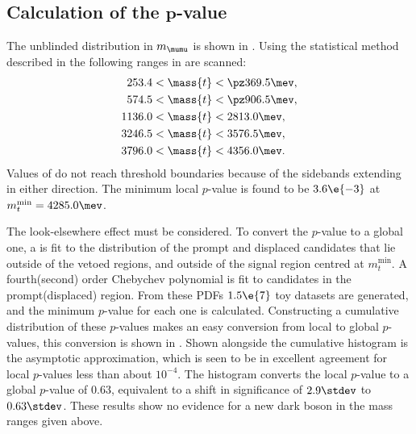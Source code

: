\subsection[Calculation of the $p$-value]
{Calculation of the $\boldsymbol{p}$-value}

The unblinded distribution in $m_{\mumu}$ is shown in .
Using the statistical method described in  the following ranges in 
are scanned:
\begin{align*}
  253.4 &< \mass{t} < \pz369.5 \mev, \\
  574.5 &< \mass{t} < \pz906.5 \mev, \\
  1136.0 &< \mass{t} < 2813.0 \mev, \\
  3246.5 &< \mass{t} < 3576.5 \mev, \\
  3796.0 &< \mass{t} < 4356.0 \mev.
\end{align*}
Values of  do not reach threshold boundaries because of the sidebands extending in either
direction.
The minimum local $p$-value is found to be $3.6\e{-3}$ at $m_{t}^\mathrm{min} = 4285.0\mev$.

The look-elsewhere effect must be considered.
To convert the $p$-value to a global one, a \PDF is fit to the \mass{\mumu} distribution of the
prompt and displaced \btokstrdb candidates that lie outside of the vetoed regions, and outside of
the signal region centred at $m_t^\mathrm{min}$.
A fourth(second) order Chebychev polynomial is fit to candidates in the prompt(displaced) region.
From these \glspl{PDF} $1.5\e{7}$ toy datasets are generated, and the minimum $p$-value for each
one is calculated.
Constructing a cumulative distribution of these $p$-values makes an easy conversion from local to
global $p$-values, this conversion is shown in .
Shown alongside the cumulative histogram is the asymptotic approximation, which is seen to be in
excellent agreement for local $p$-values less than about $10^{-4}$.
The histogram converts the local $p$-value to a global $p$-value of $0.63$, equivalent to a shift
in significance of $2.9\stdev$ to $0.63\stdev$.
These results show no evidence for a new dark boson in the mass ranges given above.

